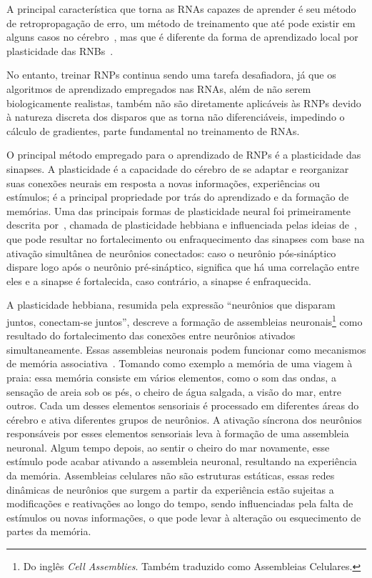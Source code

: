 A principal característica que torna as RNAs capazes de aprender é seu método de retropropagação de erro, um método de treinamento
que até pode existir em alguns casos no cérebro~\cite{lillicrapBackpropagation2020,songCan2020}, mas que é diferente da forma de
aprendizado local por plasticidade das RNBs~\cite{yamazakiSpiking2022}.

No entanto, treinar RNPs continua sendo uma tarefa desafiadora, já que os algoritmos de aprendizado empregados nas RNAs, além de
não serem biologicamente realistas, também não são diretamente aplicáveis às RNPs devido à natureza discreta dos disparos que as
torna não diferenciáveis, impedindo o cálculo de gradientes, parte fundamental no treinamento de RNAs.

O principal método empregado para o aprendizado de RNPs é a plasticidade das sinapses. A plasticidade é a capacidade do cérebro de
se adaptar e reorganizar suas conexões neurais em resposta a novas informações, experiências ou estímulos; é a principal
propriedade por trás do aprendizado e da formação de memórias. Uma das principais formas de plasticidade neural foi primeiramente
descrita por~, chamada de plasticidade hebbiana e influenciada pelas ideias
de~, que pode resultar no fortalecimento ou enfraquecimento das sinapses com base na ativação
simultânea de neurônios conectados: caso o neurônio pós-sináptico dispare logo após o neurônio pré-sináptico, significa que há uma
correlação entre eles e a sinapse é fortalecida, caso contrário, a sinapse é enfraquecida.

A plasticidade hebbiana, resumida pela expressão ``neurônios que disparam juntos, co\-nectam-se juntos'', descreve a formação de
assembleias neuronais\footnote{Do inglês \textit{Cell Assemblies}. Também traduzido como Assembleias Celulares.} como resultado do
fortalecimento das conexões entre neurônios ativados simultaneamente. Essas assembleias neuronais podem funcionar como mecanismos
de memória associativa~\cite{sakuraiMultiple2018}. Tomando como exemplo a memória de uma viagem à praia: essa memória consiste em
vários elementos, como o som das ondas, a sensação de areia sob os pés, o cheiro de água salgada, a visão do mar, entre outros.
Cada um desses elementos sensoriais é processado em diferentes áreas do cérebro e ativa diferentes grupos de neurônios. A ativação
síncrona dos neurônios responsáveis por esses elementos sensoriais leva à formação de uma assembleia neuronal. Algum tempo depois, ao
sentir o cheiro do mar novamente, esse estímulo pode acabar ativando a assembleia neuronal, resultando na experiência da memória.
Assembleias celulares não são estruturas estáticas, essas redes dinâmicas de neurônios que surgem a partir da experiência estão
sujeitas a modificações e reativações ao longo do tempo, sendo influenciadas pela falta de estímulos ou novas informações, o que
pode levar à alteração ou esquecimento de partes da memória.

